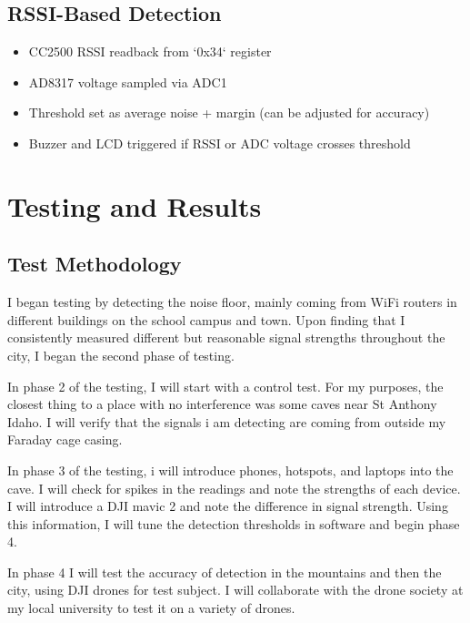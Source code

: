 \documentclass[12pt]{article}
\begin{document}
\subsection{RSSI-Based Detection}
\begin{itemize}
    \item CC2500 RSSI readback from `0x34` register
    \item AD8317 voltage sampled via ADC1
    \item Threshold set as average noise + margin (can be adjusted for accuracy)
    \item Buzzer and LCD triggered if RSSI or ADC voltage crosses threshold
\end{itemize}

\section{Testing and Results}
\subsection{Test Methodology}
\text I began testing by detecting the noise floor, mainly coming from WiFi routers in different buildings on the school campus and town. Upon finding that I consistently measured different but reasonable signal strengths throughout the city, I began the second phase of testing.

In phase 2 of the testing, I will start with a control test. For my purposes, the closest thing to a place with no interference was some caves near St Anthony Idaho. I will verify that the signals i am detecting are coming from outside my Faraday cage casing. 

In phase 3 of the testing, i will introduce phones, hotspots, and laptops into the cave. I will check for spikes in the readings and note the strengths of each device. I will introduce a DJI mavic 2 and note the difference in signal strength. Using this information, I will tune the detection thresholds in software and begin phase 4.

In phase 4 I will test the accuracy of detection in the mountains and then the city, using DJI drones for test subject. I will collaborate with the drone society at my local university to test it on a variety of drones. 
\end{document}
